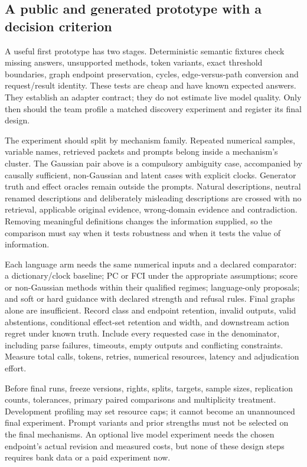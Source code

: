\hypertarget{a-public-and-generated-prototype-with-a-decision-criterion}{%
\subsection{A public and generated prototype with a decision
criterion}\label{a-public-and-generated-prototype-with-a-decision-criterion}}

A useful first prototype has two stages. Deterministic semantic fixtures
check missing answers, unsupported methods, token variants, exact
threshold boundaries, graph endpoint preservation, cycles,
edge-versus-path conversion and request/result identity. These tests are
cheap and have known expected answers. They establish an adapter
contract; they do not estimate live model quality. Only then should the
team profile a matched discovery experiment and register its final
design.

The experiment should split by mechanism family. Repeated numerical
samples, variable names, retrieved packets and prompts belong inside a
mechanism's cluster. The Gaussian pair above is a compulsory ambiguity
case, accompanied by causally sufficient, non-Gaussian and latent cases
with explicit clocks. Generator truth and effect oracles remain outside
the prompts. Natural descriptions, neutral renamed descriptions and
deliberately misleading descriptions are crossed with no retrieval,
applicable original evidence, wrong-domain evidence and contradiction.
Removing meaningful definitions changes the information supplied, so the
comparison must say when it tests robustness and when it tests the value
of information.

Each language arm needs the same numerical inputs and a declared
comparator: a dictionary/clock baseline; PC or FCI under the appropriate
assumptions; score or non-Gaussian methods within their qualified
regimes; language-only proposals; and soft or hard guidance with
declared strength and refusal rules. Final graphs alone are
insufficient. Record class and endpoint retention, invalid outputs,
valid abstentions, conditional effect-set retention and width, and
downstream action regret under known truth. Include every requested case
in the denominator, including parse failures, timeouts, empty outputs
and conflicting constraints. Measure total calls, tokens, retries,
numerical resources, latency and adjudication effort.

Before final runs, freeze versions, rights, splits, targets, sample
sizes, replication counts, tolerances, primary paired comparisons and
multiplicity treatment. Development profiling may set resource caps; it
cannot become an unannounced final experiment. Prompt variants and prior
strengths must not be selected on the final mechanisms. An optional live
model experiment needs the chosen endpoint's actual revision and
measured costs, but none of these design steps requires bank data or a
paid experiment now.

